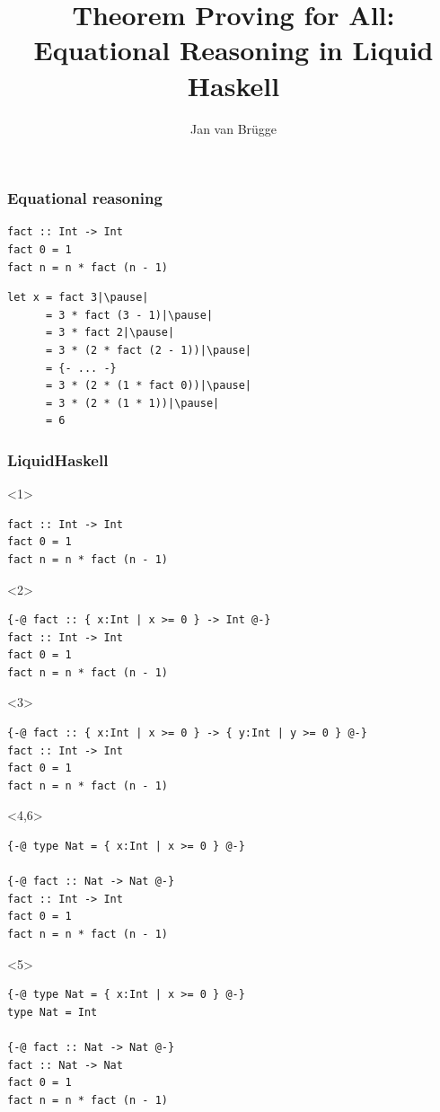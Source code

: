 \documentclass{beamer}
\title{Theorem Proving for All: Equational Reasoning in Liquid Haskell}
\subtitle{\cite{tpfa}}
\author{Jan van Brügge}
\begin{document}
\begin{frame}
\titlepage
\end{frame}

\begin{frame}[fragile]
\frametitle{Equational reasoning}

\begin{verbatim}
fact :: Int -> Int
fact 0 = 1
fact n = n * fact (n - 1)
\end{verbatim}

\pause

\vspace{10pt}

\begin{verbatim}
let x = fact 3|\pause|
      = 3 * fact (3 - 1)|\pause|
      = 3 * fact 2|\pause|
      = 3 * (2 * fact (2 - 1))|\pause|
      = {- ... -}
      = 3 * (2 * (1 * fact 0))|\pause|
      = 3 * (2 * (1 * 1))|\pause|
      = 6
\end{verbatim}

\end{frame}

\begin{frame}[fragile]
\frametitle{LiquidHaskell}

\begin{onlyenv}<1>
\begin{verbatim}
fact :: Int -> Int
fact 0 = 1
fact n = n * fact (n - 1)
\end{verbatim}
\end{onlyenv}

\begin{onlyenv}<2>
\begin{verbatim}
{-@ fact :: { x:Int | x >= 0 } -> Int @-}
fact :: Int -> Int
fact 0 = 1
fact n = n * fact (n - 1)
\end{verbatim}
\end{onlyenv}

\begin{onlyenv}<3>
\begin{verbatim}
{-@ fact :: { x:Int | x >= 0 } -> { y:Int | y >= 0 } @-}
fact :: Int -> Int
fact 0 = 1
fact n = n * fact (n - 1)
\end{verbatim}
\end{onlyenv}

\begin{onlyenv}<4,6>
\begin{verbatim}
{-@ type Nat = { x:Int | x >= 0 } @-}

{-@ fact :: Nat -> Nat @-}
fact :: Int -> Int
fact 0 = 1
fact n = n * fact (n - 1)
\end{verbatim}
\end{onlyenv}

\begin{onlyenv}<5>
\begin{verbatim}
{-@ type Nat = { x:Int | x >= 0 } @-}
type Nat = Int

{-@ fact :: Nat -> Nat @-}
fact :: Nat -> Nat
fact 0 = 1
fact n = n * fact (n - 1)
\end{verbatim}
\end{onlyenv}

\end{frame}
\end{document}
